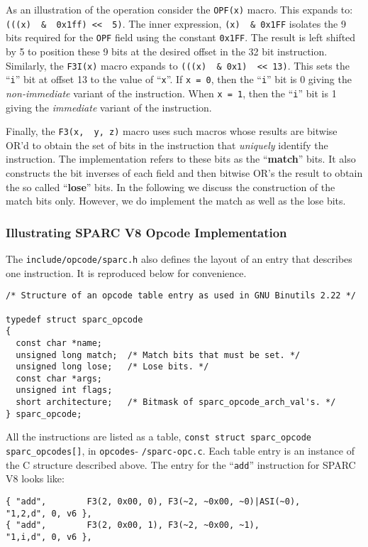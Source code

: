 As  an  illustration of  the  operation  consider the  \texttt{OPF(x)}
macro.   This expands  to: \verb|(((x)  &  0x1ff) <<  5)|.  The  inner
expression, \verb|(x)  & 0x1FF| isolates  the 9 bits required  for the
\texttt{OPF} field  using the constant \texttt{0x1FF}.   The result is
left shifted by  5 to position these  9 bits at the  desired offset in
the 32 bit instruction.  Similarly, the \verb|F3I(x)| macro expands to
\verb|(((x)  & 0x1)  << 13)|.   This  sets the  ``\texttt{i}'' bit  at
offset 13 to the value of ``\texttt{x}''.  If \texttt{x = 0}, then the
``\texttt{i}'' bit is 0 giving the \emph{non-immediate} variant of the
instruction.  When  \texttt{x = 1},  then the ``\texttt{i}'' bit  is 1
giving the \emph{immediate} variant of the instruction.

Finally, the \verb|F3(x,  y, z)| macro uses such  macros whose results
are bitwise  OR'd to obtain  the set of  bits in the  instruction that
\emph{uniquely} identify  the instruction.  The  implementation refers
to these bits as the  ``\textbf{match}'' bits.  It also constructs the
bit inverses of each field and  then bitwise OR's the result to obtain
the so called ``\textbf{lose}'' bits.  In the following we discuss the
construction of  the match  bits only.  However,  we do  implement the
match as well as the lose bits.

\subsubsection{Illustrating SPARC V8 Opcode Implementation}
\label{sec:sparc:v8:opcode:implementation}

The  \texttt{include/opcode/sparc.h} also  defines  the  layout of  an
entry  that describes  one instruction.   It is  reproduced below  for
convenience.
{\small 
\begin{verbatim}
/* Structure of an opcode table entry as used in GNU Binutils 2.22 */

typedef struct sparc_opcode
{
  const char *name;
  unsigned long match;  /* Match bits that must be set. */
  unsigned long lose;   /* Lose bits. */
  const char *args;
  unsigned int flags;
  short architecture;   /* Bitmask of sparc_opcode_arch_val's. */
} sparc_opcode;
\end{verbatim}
}

All  the instructions  are  listed as  a  table, \texttt{const  struct
  sparc\_opcode      sparc\_opcodes[]},      in      \texttt{opcodes}-
\texttt{/sparc-opc.c}.   Each table  entry  is an  instance  of the  C
structure  described  above.   The   entry  for  the  ``\texttt{add}''
instruction for SPARC V8 looks like: {\small
\begin{verbatim}
{ "add",        F3(2, 0x00, 0), F3(~2, ~0x00, ~0)|ASI(~0),      "1,2,d", 0, v6 },
{ "add",        F3(2, 0x00, 1), F3(~2, ~0x00, ~1),              "1,i,d", 0, v6 },
\end{verbatim}
}

